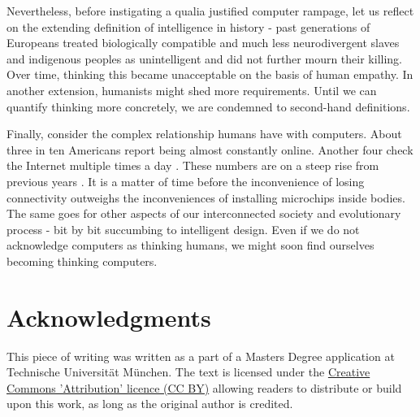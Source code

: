 \documentclass[12pt]{olplainarticle}
\begin{document}
Nevertheless, before instigating a qualia justified computer rampage, let us reflect on the extending definition of intelligence in history - past generations of Europeans treated biologically compatible and much less neurodivergent slaves and indigenous peoples as unintelligent and did not further mourn their killing. Over time, thinking this became unacceptable on the basis of human empathy. In another extension, humanists might shed more requirements. Until we can quantify thinking more concretely, we are condemned to second-hand definitions.

Finally, consider the complex relationship humans have with computers. About three in ten Americans report being almost constantly online. Another four check the Internet multiple times a day \cite{perrin_atske_2021}. These numbers are on a steep rise from previous years \cite{smith2015us}. It is a matter of time before the inconvenience of losing connectivity outweighs the inconveniences of installing microchips inside bodies. The same goes for other aspects of our interconnected society and evolutionary process - bit by bit succumbing to intelligent design. Even if we do not acknowledge computers as thinking humans, we might soon find ourselves becoming thinking computers.


\section*{Acknowledgments}

This piece of writing was written as a part of a Masters Degree application at Technische Universität München. The text is licensed under the \href{https://creativecommons.org/licenses/by/4.0/legalcode}{Creative Commons 'Attribution' licence (CC BY)} allowing readers to distribute or build upon this work, as long as the original author is credited.


\end{document}
